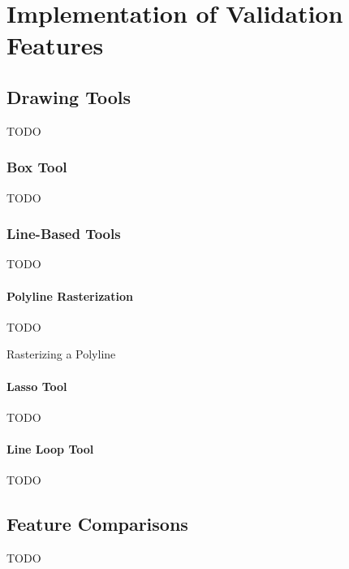 \chapter{Implementation of Validation Features}
\label{chap:appendixval}

\section{Drawing Tools}

TODO

\subsection{Box Tool}

TODO

\subsection{Line-Based Tools}

TODO

\subsubsection{Polyline Rasterization}

TODO

\begin{stulisting}[p]
\caption{Rasterizing a Polyline}
\label{code:appendixval-rasterizepolyline}

\end{stulisting}

\subsubsection{Lasso Tool}

TODO

\subsubsection{Line Loop Tool}

TODO

\section{Feature Comparisons}

TODO
